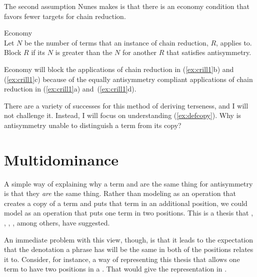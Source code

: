 \documentclass[output=paper]{langsci/langscibook}
\begin{document}
The second assumption Nunes makes is that there is an economy condition that favors fewer targets for chain reduction.
\begin{exe}
	\ex \label{ex:econ} Economy\\
	Let $N$ be the number of terms that an instance of chain reduction, $R$, applies to. Block $R$ if its $N$ is greater than the $N$ for another $R$ that satisfies antisymmetry.
\end{exe}

Economy will block the applications of chain reduction in (\ref{ex:crill1}b) and (\ref{ex:crill1}c) because of the equally antisymmetry compliant applications of chain reduction in (\ref{ex:crill1}a) and~(\ref{ex:crill1}d).

There are a variety of successes for this method of deriving terseness, and I
will not challenge it. Instead, I will focus on understanding
(\ref{ex:defcopy}). Why is antisymmetry unable to distinguish a term from its
copy?


\section{Multidominance} %
\label{sec:multidominance}

A simple way of explaining why a term and  are the same thing for antisymmetry
is that they \emph{are} the same thing. Rather than modeling  as an
operation that creates a copy of a term and puts
that term in an additional position, we could model  as an operation
that puts one term in two positions. This is a thesis that \citet{Engdahl1980},
\citet{Starke2001}, \citet{deVries2007}, \citet{Gartner2002}, among others,
have suggested.

An immediate problem with this view, though, is that it leads to the
expectation that the denotation a phrase has will be the same in both of the
positions  relates it to. Consider, for instance, a way of representing
this thesis that allows one term to have two positions in a . That
would give  the representation in .
\end{document}
